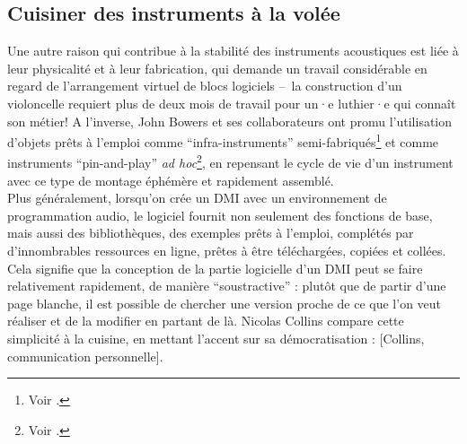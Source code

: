 \subsection{Cuisiner des instruments à la volée}

\noindent Une autre raison qui contribue à la stabilité des instruments acoustiques est liée à leur physicalité et à leur fabrication, qui demande un travail considérable en regard de l'arrangement virtuel de blocs logiciels --~la construction d'un violoncelle requiert plus de deux mois de travail pour un·e luthier·e qui connaît son métier! A l'inverse, John Bowers et ses collaborateurs ont promu l'utilisation d'objets prêts à l'emploi comme ``infra-instruments'' semi-fabriqués\footnote{Voir \cite{bowers_not_2005}.} et comme instruments ``pin-and-play'' \textit{ad hoc}\footnote{Voir \cite{bowers_creating_2006}.}, en repensant le cycle de vie d'un instrument avec ce type de montage éphémère et rapidement assemblé.\\
\indent Plus généralement, lorsqu'on crée un \gls{DMI} avec un environnement de programmation audio, le logiciel fournit non seulement des fonctions de base, mais aussi des bibliothèques, des exemples prêts à l'emploi, complétés par d'innombrables ressources en ligne, prêtes à être téléchargées, copiées et collées. Cela signifie que la conception de la partie logicielle d'un \gls{DMI} peut se faire relativement rapidement, de manière ``soustractive'' : plutôt que de partir d'une page blanche, il est possible de chercher une version proche de ce que l'on veut réaliser et de la modifier en partant de là. Nicolas Collins compare cette simplicité à la cuisine, en mettant l'accent sur sa démocratisation :  [Collins, communication personnelle].\\
